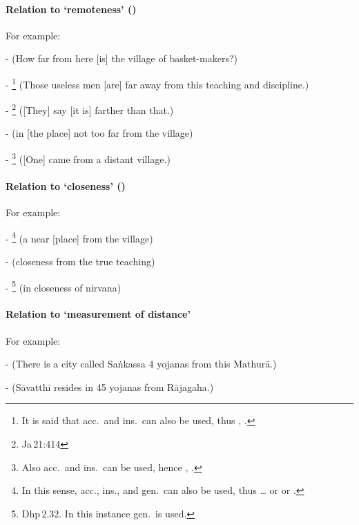 \paragraph*{Relation to `remoteness' ()} For example:\par
-  (How far from here [is] the village of basket-makers?)\par
- \footnote{It is said that acc.\ and ins.\ can also be used, thus , .} (Those useless men [are] far away from this teaching and discipline.)\par
- \footnote{Ja\,21:414} ([They] say [it is] farther than that.)\par
-  (in [the place] not too far from the village)\par
- \footnote{Also acc.\ and ins.\ can be used, hence , .} ([One] came from a distant village.)\par

\paragraph*{Relation to `closeness' ()} For example:\par
- \footnote{In this sense, acc., ins., and gen.\ can also be used, thus \ldots {} or  or .} (a near [place] from the village)\par
-  (closeness from the true teaching)\par
- \footnote{Dhp\,2.32. In this instance gen.\ is used.} (in closeness of nirvana)\par

\paragraph*{Relation to `measurement of distance'} For example:\par
-  (There is a city called Sa\.nkassa 4 yojanas from this Mathur\=a.)\par
-  (S\=avatth\=i resides in 45 yojanas from R\=ajagaha.)\par


